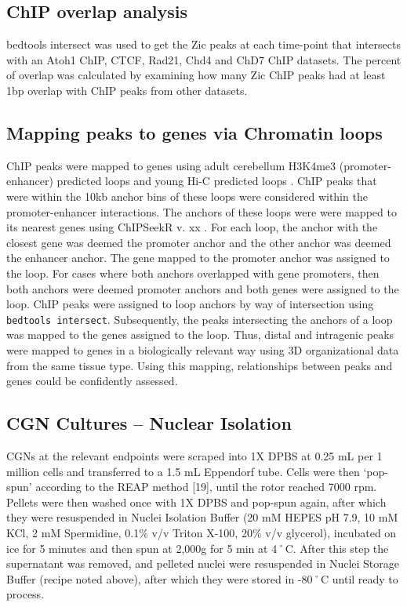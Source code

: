 \documentclass[fleqn,10pt]{wlscirep}
\begin{document}
\subsection*{ChIP overlap analysis}
bedtools intersect was used to get the Zic peaks at each time-point that intersects with an Atoh1 ChIP, CTCF, Rad21, Chd4 and ChD7 ChIP datasets. The percent of overlap was calculated by examining how many Zic ChIP peaks had at least 1bp overlap with ChIP peaks from other datasets. 

\subsection*{Mapping peaks to genes via Chromatin loops}
ChIP peaks were mapped to genes using adult cerebellum H3K4me3 (promoter-enhancer) predicted loops \cite{Yamada2019SensoryLearning} and young Hi-C predicted loops \cite{Goodman2019RegulationRemodeling}. ChIP peaks that were within the 10kb anchor bins of these loops were considered within the promoter-enhancer interactions. The anchors of these loops were were mapped to its nearest genes using ChIPSeekR v. xx \cite{}. For each loop, the anchor with the closest gene was deemed the promoter anchor and the other anchor was deemed the enhancer anchor. The gene mapped to the promoter anchor was assigned to the loop. For cases where both anchors overlapped with gene promoters, then both anchors were deemed promoter anchors and both genes were assigned to the loop. ChIP peaks were assigned to loop anchors by way of intersection using \texttt{bedtools intersect}. Subsequently, the peaks intersecting the anchors of a loop was mapped to the genes assigned to the loop. Thus, distal and intragenic peaks were mapped to genes in a biologically relevant way using 3D organizational data from the same tissue type. Using this mapping, relationships between peaks and genes could be confidently assessed.  


\subsection*{CGN Cultures – Nuclear Isolation}
CGNs at the relevant endpoints were scraped into 1X DPBS at 0.25 mL per 1 million cells and transferred to a 1.5 mL Eppendorf tube. Cells were then ‘pop-spun’ according to the REAP method [19], until the rotor reached 7000 rpm. Pellets were then washed once with 1X DPBS and pop-spun again, after which they were resuspended in Nuclei Isolation Buffer (20 mM HEPES pH 7.9, 10 mM KCl, 2 mM Spermidine, 0.1\% v/v Triton X-100, 20\% v/v glycerol), incubated on ice for 5 minutes and then spun at 2,000g for 5 min at 4˚C. After this step the supernatant was removed, and pelleted nuclei were resuspended in Nuclei Storage Buffer (recipe noted above), after which they were stored in -80˚C until ready to process.
\end{document}
